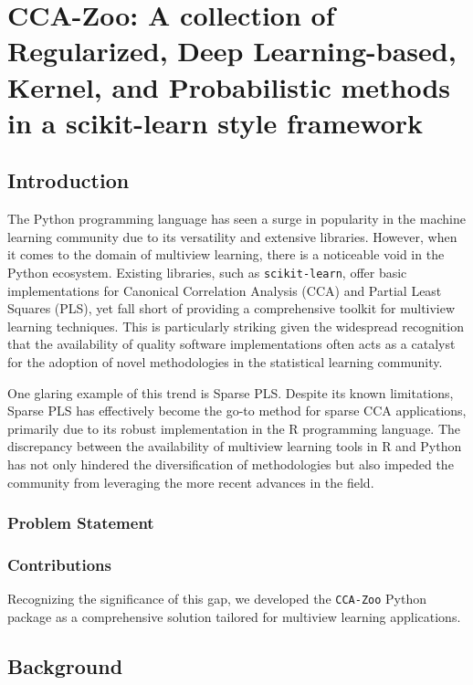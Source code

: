 \chapter{CCA-Zoo: A collection of Regularized, Deep Learning-based, Kernel, and Probabilistic methods in a scikit-learn style framework}\label{ch:ccazoo}
\section{Introduction}

The Python programming language has seen a surge in popularity in the machine learning community due to its versatility and extensive libraries.
However, when it comes to the domain of multiview learning, there is a noticeable void in the Python ecosystem.
Existing libraries, such as \texttt{scikit-learn}\cite{pedregosa2011scikit}, offer basic implementations for Canonical Correlation Analysis (CCA) and Partial Least Squares (PLS), yet fall short of providing a comprehensive toolkit for multiview learning techniques.
This is particularly striking given the widespread recognition that the availability of quality software implementations often acts as a catalyst for the adoption of novel methodologies in the statistical learning community.

One glaring example of this trend is Sparse PLS. Despite its known limitations, Sparse PLS has effectively become the go-to method for sparse CCA applications, primarily due to its robust implementation in the R programming language.
The discrepancy between the availability of multiview learning tools in R and Python has not only hindered the diversification of methodologies but also impeded the community from leveraging the more recent advances in the field.

\subsection{Problem Statement}

\subsection{Contributions}
Recognizing the significance of this gap, we developed the \texttt{CCA-Zoo} Python package as a comprehensive solution tailored for multiview learning applications.


\section{Background}


